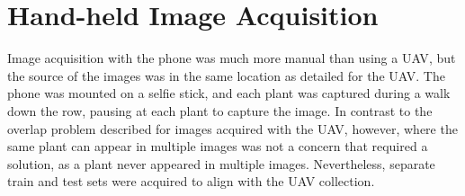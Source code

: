 \documentclass[letterpaper, notitlepage]{report}
\begin{document}
\section{Hand-held Image Acquisition}
Image acquisition with the phone was much more manual than using a \gls{UAV}, but the source of the images was in the same location as detailed for the \gls{UAV}. The phone was mounted on a selfie stick, and each plant was captured during a walk down the row, pausing at each plant to capture the image. In contrast to the overlap problem described for images acquired with the \gls{UAV}, however, where the same plant can appear in multiple images was not a concern that required a solution, as a plant never appeared in multiple images. Nevertheless, separate train and test sets were acquired to align with the \gls{UAV} collection.
\end{document}

